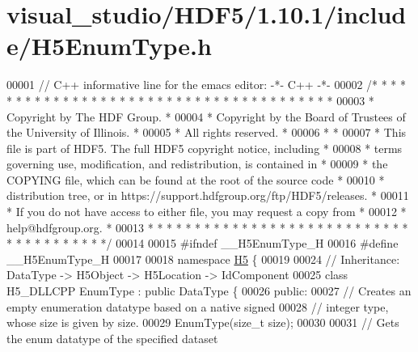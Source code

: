 \hypertarget{visual__studio_2_h_d_f5_21_810_81_2include_2_h5_enum_type_8h_source}{}\section{visual\+\_\+studio/\+H\+D\+F5/1.10.1/include/\+H5\+Enum\+Type.h}
\label{visual__studio_2_h_d_f5_21_810_81_2include_2_h5_enum_type_8h_source}

\begin{DoxyCode}
00001 \textcolor{comment}{// C++ informative line for the emacs editor: -*- C++ -*-}
00002 \textcolor{comment}{/* * * * * * * * * * * * * * * * * * * * * * * * * * * * * * * * * * * * * * *}
00003 \textcolor{comment}{ * Copyright by The HDF Group.                                               *}
00004 \textcolor{comment}{ * Copyright by the Board of Trustees of the University of Illinois.         *}
00005 \textcolor{comment}{ * All rights reserved.                                                      *}
00006 \textcolor{comment}{ *                                                                           *}
00007 \textcolor{comment}{ * This file is part of HDF5.  The full HDF5 copyright notice, including     *}
00008 \textcolor{comment}{ * terms governing use, modification, and redistribution, is contained in    *}
00009 \textcolor{comment}{ * the COPYING file, which can be found at the root of the source code       *}
00010 \textcolor{comment}{ * distribution tree, or in https://support.hdfgroup.org/ftp/HDF5/releases.  *}
00011 \textcolor{comment}{ * If you do not have access to either file, you may request a copy from     *}
00012 \textcolor{comment}{ * help@hdfgroup.org.                                                        *}
00013 \textcolor{comment}{ * * * * * * * * * * * * * * * * * * * * * * * * * * * * * * * * * * * * * * */}
00014 
00015 \textcolor{preprocessor}{#ifndef \_\_H5EnumType\_H}
00016 \textcolor{preprocessor}{#define \_\_H5EnumType\_H}
00017 
00018 \textcolor{keyword}{namespace }\hyperlink{namespace_h5}{H5} \{
00019 
00024 \textcolor{comment}{//  Inheritance: DataType -> H5Object -> H5Location -> IdComponent}
00025 \textcolor{keyword}{class }H5\_DLLCPP EnumType : \textcolor{keyword}{public} DataType \{
00026    \textcolor{keyword}{public}:
00027         \textcolor{comment}{// Creates an empty enumeration datatype based on a native signed}
00028         \textcolor{comment}{// integer type, whose size is given by size.}
00029         EnumType(\textcolor{keywordtype}{size\_t} size);
00030 
00031         \textcolor{comment}{// Gets the enum datatype of the specified dataset}

\end{DoxyCode}
